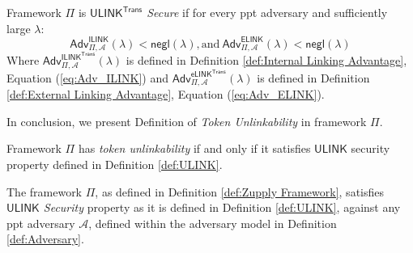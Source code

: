 \begin{definition}
    \label{def:ULINK}
    Framework $\Pi$ is \textit{$\mathsf{ULINK}^\mathsf{Trans}$ Secure} if for every \gls{ppt} adversary and sufficiently large $\lambda$:
    \begin{equation*}
        \mathsf{Adv}^{\mathsf{ILINK}}_{\Pi, \mathcal{A}}(\lambda) < \mathsf{negl}(\lambda), \text{and}\ \mathsf{Adv}^{\mathsf{ELINK}}_{\Pi, \mathcal{A}}(\lambda) < \mathsf{negl}(\lambda) 
    \end{equation*}
    Where $\mathsf{Adv}^{\mathsf{ILINK}^\textsf{Trans}}_{\Pi, \mathcal{A}}(\lambda)$ is defined in Definition \ref{def:Internal Linking Advantage}, Equation (\ref{eq:Adv_ILINK}) and $\mathsf{Adv}^{\mathsf{eLINK}^\textsf{Trans}}_{\Pi, \mathcal{A}}(\lambda)$  is defined in Definition \ref{def:External Linking Advantage}, Equation (\ref{eq:Adv_ELINK}).
\end{definition}

In conclusion, we present Definition of \textit{Token Unlinkability} in framework $\Pi$.

\begin{definition}
    \label{def:Token Unlinkability}
     Framework $\Pi$ has \textit{token unlinkability}  if and only if it satisfies $\mathsf{ULINK}$ security property defined in Definition \ref{def:ULINK}.
    \end{definition}



\begin{theorem}
    
        The framework $\Pi$, as defined in Definition \ref{def:Zupply Framework}, satisfies \textit{$\mathsf{ULINK}$ Security} property as it is defined in Definition \ref{def:ULINK}, against any \gls{ppt} adversary $\mathcal{A}$, defined within the adversary model in Definition \ref{def:Adversary}.
\end{theorem}


